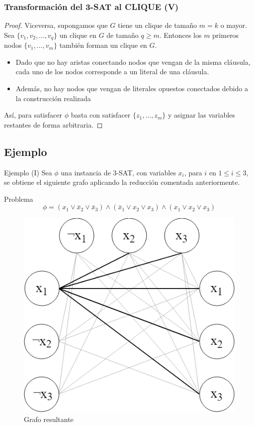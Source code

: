 \documentclass{beamer}
\begin{document}

\begin{frame}
\frametitle{Transformación del 3-SAT al CLIQUE (V)}
    \begin{proof}
    Viceversa, supongamos que $G$ tiene un clique de tamaño $m = k$ o mayor. Sea $\{v_{1}, v_{2}, ..., v_{q}\}$ un clique en $G$ de tamaño $q \geq m$. Entonces los $m$ primeros nodos $\{v_{1}, ..., v_{m}\}$ también forman un clique en $G$.
    \begin{itemize}
        \item Dado que no hay aristas conectando nodos que vengan de la misma cláusula, cada uno de los nodos corresponde a un literal de una cláusula.
        \item Además, no hay nodos que vengan de literales opuestos conectados debido a la construcción realizada
    \end{itemize}
    Así, para satisfacer $\phi$ basta con satisfacer $\{z_{1}, ..., z_{m}\}$ y asignar las variables restantes de forma arbitraria.
    \end{proof}
\end{frame}


\subsection{Ejemplo}

\begin{frame}{Ejemplo (I)}
Sea $\phi$ una instancia de 3-SAT, con variables $x_{i}$, para $i$ en $1 \leq i \leq 3$, se obtiene el siguiente grafo aplicando la reducción comentada anteriormente. 
\begin{block}{Problema}
$$\phi = (x_{1}\lor \bar{x}_{2} \lor \bar{x}_{3}) \land (\bar{x}_{1} \lor x_{2} \lor x_{3}) \land (x_{1} \lor x_{2} \lor x_{3})$$
\end{block}

\begin{figure}
\includegraphics[width=0.4\linewidth]{img/Grafo_Ejemplo_Clique.png}
\caption{Grafo resultante}
\end{figure}
\end{frame}
\end{document}
